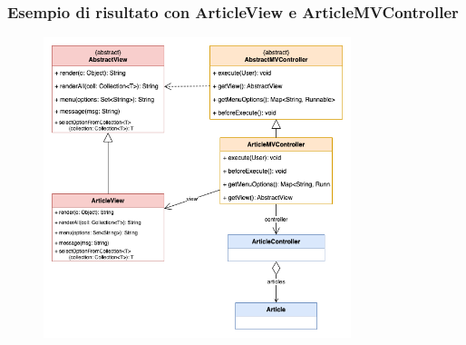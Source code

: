 \begin{frame}
    \frametitle{Esempio di risultato con ArticleView e ArticleMVController}
    \begin{figure}
        \includegraphics[width=0.8\textwidth]{img/modello-vista_after.png}
    \end{figure}
\end{frame}
